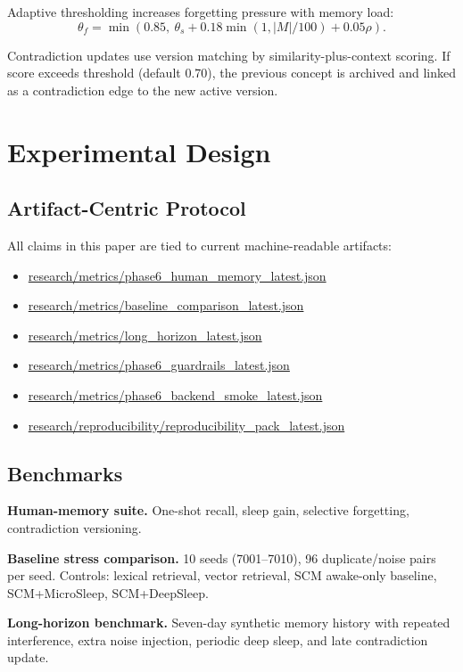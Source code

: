 \documentclass[11pt,a4paper]{article}
\begin{document}
Adaptive thresholding increases forgetting pressure with memory load:
\begin{equation}
\theta_f=\min\left(0.85,\ \theta_s + 0.18\min(1,|M|/100) + 0.05\rho\right).
\label{eq:adaptive_threshold}
\end{equation}

Contradiction updates use version matching by similarity-plus-context scoring. If score exceeds threshold (default 0.70), the previous concept is archived and linked as a contradiction edge to the new active version.

\section{Experimental Design}
\subsection{Artifact-Centric Protocol}
All claims in this paper are tied to current machine-readable artifacts:
\begin{itemize}[leftmargin=1.4em]
    \item \url{research/metrics/phase6_human_memory_latest.json}
    \item \url{research/metrics/baseline_comparison_latest.json}
    \item \url{research/metrics/long_horizon_latest.json}
    \item \url{research/metrics/phase6_guardrails_latest.json}
    \item \url{research/metrics/phase6_backend_smoke_latest.json}
    \item \url{research/reproducibility/reproducibility_pack_latest.json}
\end{itemize}

\subsection{Benchmarks}
\textbf{Human-memory suite.} One-shot recall, sleep gain, selective forgetting, contradiction versioning.

\textbf{Baseline stress comparison.} 10 seeds (7001--7010), 96 duplicate/noise pairs per seed. Controls: lexical retrieval, vector retrieval, SCM awake-only baseline, SCM+MicroSleep, SCM+DeepSleep.

\textbf{Long-horizon benchmark.} Seven-day synthetic memory history with repeated interference, extra noise injection, periodic deep sleep, and late contradiction update.
\end{document}
